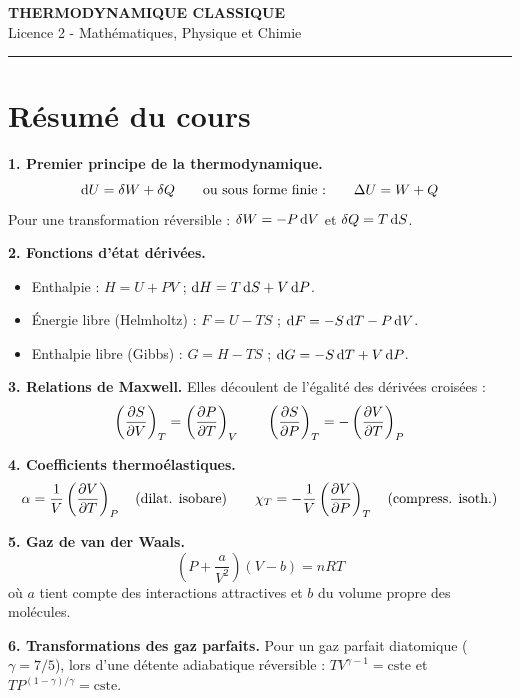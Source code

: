 \documentclass[12pt,a4paper]{article}
\begin{document}
\fi

\begin{center}
  {\LARGE\bfseries THERMODYNAMIQUE CLASSIQUE}\\[0.3cm]
  {\normalsize Licence 2 - Mathématiques, Physique et Chimie}\\[0.1cm]
  \rule{0.7\textwidth}{0.8pt}
\end{center}

\vspace{0.3cm}

\section*{Résumé du cours}

\begin{boiteresume}

\textbf{1. Premier principe de la thermodynamique.}
\[
\mathrm{d} U = \delta W + \delta Q \qquad \text{ou sous forme finie :} \qquad \Delta U = W + Q
\]
Pour une transformation réversible : $\delta W = -P\,\mathrm{d} V$ et $\delta Q = T\,\mathrm{d} S$.

\textbf{2. Fonctions d'état dérivées.}
\begin{itemize}[nosep]
  \item Enthalpie : $H = U + PV$ ; $\mathrm{d} H = T\,\mathrm{d} S + V\,\mathrm{d} P$.
  \item Énergie libre (Helmholtz) : $F = U - TS$ ; $\mathrm{d} F = -S\,\mathrm{d} T - P\,\mathrm{d} V$.
  \item Enthalpie libre (Gibbs) : $G = H - TS$ ; $\mathrm{d} G = -S\,\mathrm{d} T + V\,\mathrm{d} P$.
\end{itemize}

\textbf{3. Relations de Maxwell.} Elles découlent de l'égalité des dérivées croisées :
\[
\left(\dfrac{\partial S}{\partial V}\right)_T = \left(\dfrac{\partial P}{\partial T}\right)_V \qquad \left(\dfrac{\partial S}{\partial P}\right)_T = -\left(\dfrac{\partial V}{\partial T}\right)_P
\]

\textbf{4. Coefficients thermoélastiques.}
\[
\alpha = \frac{1}{V}\left(\dfrac{\partial V}{\partial T}\right)_P \quad (\text{dilat. isobare}) \qquad \chi_T = -\frac{1}{V}\left(\dfrac{\partial V}{\partial P}\right)_T \quad (\text{compress. isoth.})
\]

\textbf{5. Gaz de van der Waals.}
\[
\left(P + \frac{a}{V^2}\right)(V - b) = nRT
\]
où $a$ tient compte des interactions attractives et $b$ du volume propre des molécules.

\textbf{6. Transformations des gaz parfaits.} Pour un gaz parfait diatomique ($\gamma = 7/5$), lors d'une détente adiabatique réversible : $TV^{\gamma-1} = \text{cste}$ et $TP^{(1-\gamma)/\gamma} = \text{cste}$.

\end{boiteresume}
\end{document}
